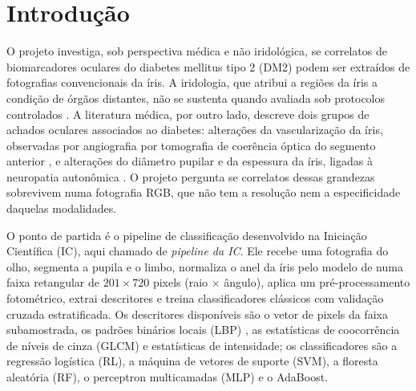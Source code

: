 \chapter{Introdução}
\label{cap:intro}

O projeto investiga, sob perspectiva médica e não iridológica, se correlatos
de biomarcadores oculares do diabetes mellitus tipo 2 (DM2) podem ser
extraídos de fotografias convencionais da íris. A iridologia, que atribui a
regiões da íris a condição de órgãos distantes, não se sustenta quando
avaliada sob protocolos controlados \citep*{Simon1979,Ernst2000}. A
literatura médica, por outro lado, descreve dois grupos de achados oculares
associados ao diabetes: alterações da vascularização da íris, observadas por
angiografia por tomografia de coerência óptica do segmento anterior
\citep*{Roberts2017,Zett2018,Zhou2025}, e alterações do diâmetro pupilar e da
espessura da íris, ligadas à neuropatia autonômica
\citep*{Cahill2001,Cui2024,Thakar2025}. O projeto pergunta se correlatos dessas
grandezas sobrevivem numa fotografia RGB, que não tem a resolução nem a
especificidade daquelas modalidades.


O ponto de partida é o pipeline de classificação desenvolvido na Iniciação
Científica (IC), aqui chamado de \emph{pipeline da IC}. Ele recebe uma
fotografia do olho, segmenta a pupila e o limbo, normaliza o anel da íris
pelo modelo \rs{} de \citet{Daugman2004} numa faixa retangular de
$201\times720$ pixels (raio $\times$ ângulo), aplica um pré-processamento
fotométrico, extrai descritores e treina classificadores clássicos com
validação cruzada estratificada. Os descritores disponíveis são o vetor de
pixels da faixa subamostrada, os padrões binários locais (LBP)
\citep*{Ojala2002}, as estatísticas de coocorrência de níveis de cinza (GLCM)
\citep*{Haralick1973} e estatísticas de intensidade; os classificadores são a
regressão logística (RL), a máquina de vetores de suporte (SVM), a floresta
aleatória (RF), o perceptron multicamadas (MLP) e o AdaBoost.

